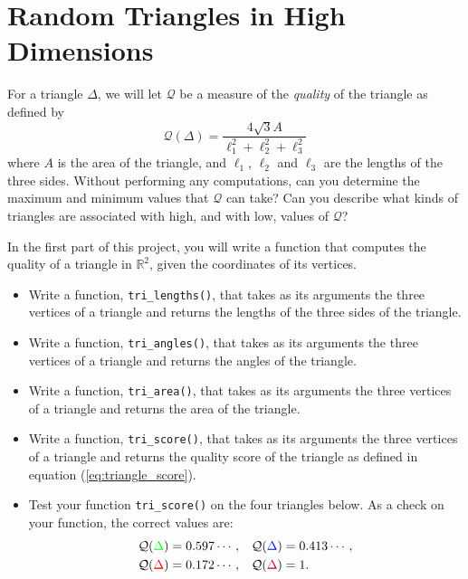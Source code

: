 \section{Random Triangles in High Dimensions}

For a triangle $\Delta$, we will let $\mathcal{Q}$ be a measure of the \textit{quality} of the triangle as defined by
\begin{equation}
\label{eq:triangle_score}
\mathcal{Q}(\Delta) = \frac{4\sqrt{3} A}{ \ell_1^2 + \ell_2^2 + \ell_3^2}
\end{equation}
where $A$ is the area of the triangle, and $\ell_1$, $\ell_2$ and $\ell_3$ are the lengths of the three sides.
Without performing any computations, can you determine the maximum and minimum values that $\mathcal{Q}$ can take? Can you describe what kinds of triangles are associated with high, and with low, values of $\mathcal{Q}$?

In the first part of this project, you will write a function that computes the quality of a triangle in $\mathbb{R}^2$, given the coordinates of its vertices.

\begin{itemize}
  \item Write a function, \texttt{tri\_lengths()}, that takes as its arguments the three vertices of a triangle and returns the lengths of the three sides of the triangle.  
  \item Write a function, \texttt{tri\_angles()}, that takes as its arguments the three vertices of a triangle and returns the angles of the triangle.
  \item Write a function, \texttt{tri\_area()}, that takes as its arguments the three vertices of a triangle and returns the area of the triangle.
  \item Write a function, \texttt{tri\_score()}, that takes as its arguments the three vertices of a triangle and returns the quality score of the triangle as defined in equation (\ref{eq:triangle_score}). 
  \item Test your function \texttt{tri\_score()} on the four triangles below. As a check on your function, the correct values are:
\begin{align*}
	\mathcal{Q}({\color{green}{\Delta}}) &= 0.597\cdots,
&	\mathcal{Q}({ \color{blue}{\Delta}}) &= 0.413\cdots,\\
	\mathcal{Q}({\color{red}{\Delta}}) &=0.172\cdots , 
&	\mathcal{Q}({ \color{purple}{\Delta}}) &= 1.
\end{align*}
\end{itemize}

